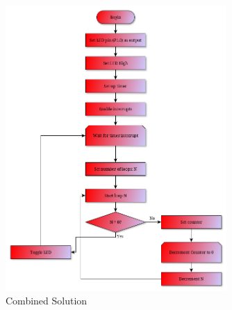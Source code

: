 \documentclass{article}
\begin{document}
\pagebreak

\begin{centering}
\begin{figure}[H]
\label{system}
\centering
\includegraphics[width = 0.75\textwidth]{Lab0_part3.png}
\captionsetup{format = hang, width = 0.75\textwidth}
\caption{Combined Solution}
\label{fig:DecInt}
\end{figure}
\end{centering}



\end{document}
